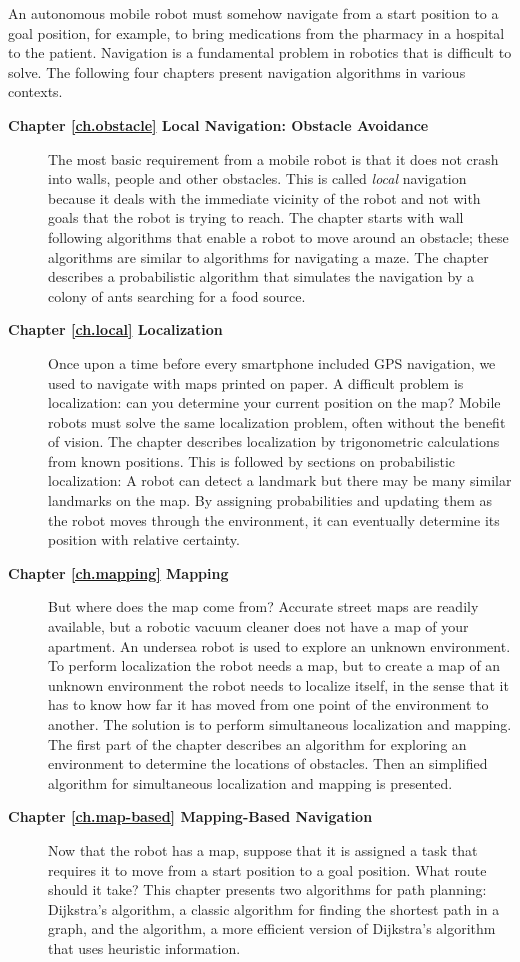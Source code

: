 An autonomous mobile robot must somehow navigate from a start position to a goal position, for example, to bring medications from the pharmacy in a hospital to the patient. Navigation is a fundamental problem in robotics that is difficult to solve. The following four chapters present navigation algorithms in various contexts.
\begin{description}
\item [\textbf{Chapter \ref{ch.obstacle} Local Navigation: Obstacle Avoidance}] The most basic requirement from a mobile robot is that it does not crash into walls, people and other obstacles. This is called \emph{local} navigation because it deals with the immediate vicinity of the robot and not with goals that the robot is trying to reach. The chapter starts with wall following algorithms that enable a robot to move around an obstacle; these algorithms are similar to algorithms for navigating a maze. The chapter describes a probabilistic algorithm that simulates the navigation by a colony of ants searching for a food source.
\smallskip
\item [\textbf{Chapter \ref{ch.local} Localization}] Once upon a time before every smartphone included GPS navigation, we used to navigate with maps printed on paper. A difficult problem is localization: can you determine your current position on the map? Mobile robots must solve the same localization problem, often without the benefit of vision. The chapter describes localization by trigonometric calculations from known positions. This is followed by sections on probabilistic localization: A robot can detect a landmark but there may be many similar landmarks on the map. By assigning probabilities and updating them as the robot moves through the environment, it can eventually determine its position with relative certainty.
\smallskip
\item [\textbf{Chapter \ref{ch.mapping} Mapping}] But where does the map come from? Accurate street maps are readily available, but a robotic vacuum cleaner does not have a map of your apartment. An undersea robot is used to explore an unknown environment. To perform localization the robot needs a map, but to create a map of an unknown environment the robot needs to localize itself, in the sense that it has to know how far it has moved from one point of the environment to another. The solution is to perform simultaneous localization and mapping. The first part of the chapter describes an algorithm for exploring an environment to determine the locations of obstacles. Then an simplified algorithm for simultaneous localization and mapping is presented.
\smallskip
\item [\textbf{Chapter \ref{ch.map-based} Mapping-Based Navigation}] Now that the robot has a map, suppose that it is assigned a task that requires it to move from a start position to a goal position. What route should it take? This chapter presents two algorithms for path planning: Dijkstra's algorithm, a classic algorithm for finding the shortest path in a graph, and the \astar{} algorithm, a more efficient version of Dijkstra's algorithm that uses heuristic information.
\end{description}

